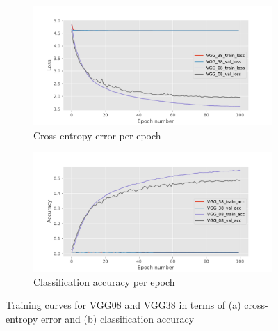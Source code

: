 \documentclass{article}
\begin{document}
\begin{figure}[t]
    \begin{subfigure}{\linewidth}
        \centering
        \includegraphics[width=\linewidth]{figures/loss_plot.pdf}
        \caption{Cross entropy error per epoch}
        \label{fig:loss_curves}
    \end{subfigure}

    \begin{subfigure}{\linewidth}
        \centering
        \includegraphics[width=\linewidth]{figures/accuracy_plot.pdf}
        \caption{Classification accuracy per epoch}
        \label{fig:acc_curves}
    \end{subfigure}
    \caption{Training curves for VGG08 and VGG38 in terms of (a) cross-entropy error and (b) classification accuracy}
    \label{fig:curves}
\end{figure}
\end{document}
